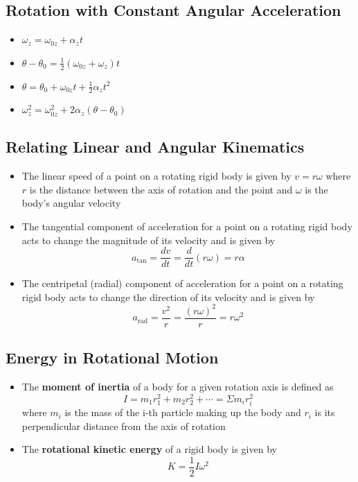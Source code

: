 \documentclass{article}
\begin{document}
\subsection{Rotation with Constant Angular Acceleration}

\begin{itemize}
    \item $\omega_z=\omega_{0z}+\alpha_zt$

    \item $\theta-\theta_0=\frac{1}{2}\left(\omega_{0z}+\omega_z\right)t$

    \item $\theta=\theta_0+\omega_{0z}t+\frac{1}{2}\alpha_zt^2$

    \item $\omega_z^2=\omega_{0z}^2+2\alpha_z\left(\theta-\theta_0\right)$
\end{itemize}

\subsection{Relating Linear and Angular Kinematics}

\begin{itemize}
    \item The linear speed of a point on a rotating rigid body is given by $v=r\omega$ where $r$ is the distance between the axis of rotation and the point and $\omega$ is the body's angular velocity

    \item The tangential component of acceleration for a point on a rotating rigid body acts to change the magnitude of its velocity and is given by \[a_\textrm{tan}=\frac{dv}{dt}=\frac{d}{dt}(r\omega)=r\alpha\]

    \item The centripetal (radial) component of acceleration for a point on a rotating rigid body acts to change the direction of its velocity and is given by \[a_\textrm{rad}=\frac{v^2}{r}=\frac{(r\omega)^2}{r}=r\omega^2\]
\end{itemize}

\subsection{Energy in Rotational Motion}

\begin{itemize}
    \item The \textbf{moment of inertia} of a body for a given rotation axis is defined as \[I=m_1r_1^2+m_2r_2^2+\cdots=\Sigma m_ir_i^2\] where $m_i$ is the mass of the i-th particle making up the body and $r_i$ is its perpendicular distance from the axis of rotation

    \item The \textbf{rotational kinetic energy} of a rigid body is given by \[K=\frac{1}{2}I\omega^2\]
\end{itemize}
\end{document}
